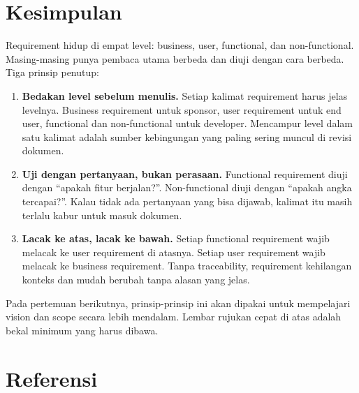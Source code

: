 \documentclass[11pt,a4paper]{article}
\begin{document}
\section{Kesimpulan}

Requirement hidup di empat level: business, user, functional, dan non-functional. Masing-masing punya pembaca utama berbeda dan diuji dengan cara berbeda. Tiga prinsip penutup:

\begin{enumerate}
	\item \textbf{Bedakan level sebelum menulis.} Setiap kalimat requirement harus jelas levelnya. Business requirement untuk sponsor, user requirement untuk end user, functional dan non-functional untuk developer. Mencampur level dalam satu kalimat adalah sumber kebingungan yang paling sering muncul di revisi dokumen.
	\item \textbf{Uji dengan pertanyaan, bukan perasaan.} Functional requirement diuji dengan ``apakah fitur berjalan?''. Non-functional diuji dengan ``apakah angka tercapai?''. Kalau tidak ada pertanyaan yang bisa dijawab, kalimat itu masih terlalu kabur untuk masuk dokumen.
	\item \textbf{Lacak ke atas, lacak ke bawah.} Setiap functional requirement wajib melacak ke user requirement di atasnya. Setiap user requirement wajib melacak ke business requirement. Tanpa traceability, requirement kehilangan konteks dan mudah berubah tanpa alasan yang jelas.
\end{enumerate}

Pada pertemuan berikutnya, prinsip-prinsip ini akan dipakai untuk mempelajari vision dan scope secara lebih mendalam. Lembar rujukan cepat di atas adalah bekal minimum yang harus dibawa.

\newpage
\section*{Referensi}
\end{document}
